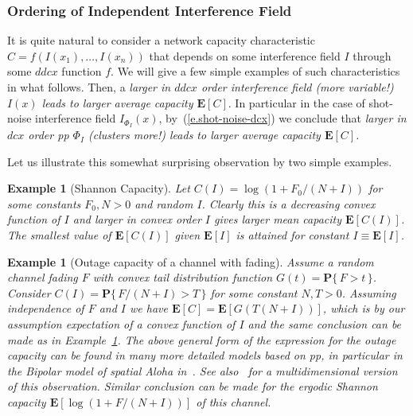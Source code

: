 \documentclass[conference]{IEEEtran}
\newtheorem{ex}[Th]{Example}
\begin{document}
\subsubsection{Ordering of Independent Interference Field}
  
It is quite natural to consider a network capacity characteristic
$C=f(I(x_1),\ldots, I(x_n))$ that depends on some interference
field $I$ through some $ddcx$ function $f$. We will
give a few simple examples of such characteristics in what follows.
Then, a {\em larger in $ddcx$ order interference field (more variable!)
$I(x)$ leads to larger average capacity ${{\mathbf E}}[C]$}. In particular
in the case of shot-noise interference field $I_{\Phi_I}(x)$,
by~(\ref{e.shot-noise-dcx}) we conclude that {\em larger in  $dcx$
  order pp $\Phi_I$ (clusters more!) leads to larger average
  capacity ${{\mathbf E}}[C]$}.  

Let us illustrate this somewhat surprising observation by two simple
examples.
\begin{ex}[Shannon Capacity] 
\label{ex.shannon}
Let $C(I)=\log(1+F_0/(N+I))$ for some constants $F_0,N>0$ and random $I$.
Clearly this is a decreasing convex function of $I$ and
larger in convex order $I$ gives larger mean capacity ${{\mathbf E}}[C(I)]$.
The smallest value of ${{\mathbf E}}[C(I)]$ given ${{\mathbf E}}[I]$ is attained for
constant $I\equiv{{\mathbf E}}[I]$.   
\end{ex}

\begin{ex}[Outage capacity of a channel with fading]
Assume a random channel fading $F$ with convex tail
distribution function $G(t)={{\mathbf P}}\{\,F> t\,\}$.
Consider $C(I)={{\mathbf P}}\{\,F/(N+I)>T\,\}$ for some constant $N,T>0$.
Assuming independence of $F$ and $I$
we have ${{\mathbf E}}[C]={{\mathbf E}}[G(T(N+I))]$, which is by our assumption expectation
of a  convex
function of $I$ and the same conclusion can be made as in
Example~\ref{ex.shannon}. The above general form of 
the expression for the outage capacity can be found in many more
detailed models based on pp, in particular in the Bipolar model of
spatial Aloha in~\cite[Chapter~16]{FnT2}.
See also~\cite{snorder} for a multidimensional version of this observation.
Similar conclusion can be made for the ergodic Shannon capacity 
${{\mathbf E}}[\log(1+F/(N+I))]$  of 
this channel. 
\end{ex}
\end{document}
